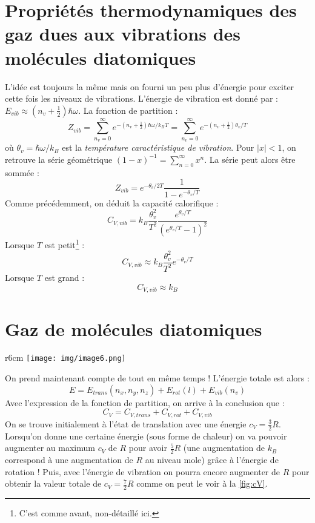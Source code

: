 \documentclass[british,french,11pt, a4paper, openany]{book}
\begin{document}
\section{Propriétés thermodynamiques des gaz dues aux vibrations des molécules 
	diatomiques}
L'idée est toujours la même mais on fourni un peu plus d'énergie pour exciter cette fois
les niveaux de vibrations. L'énergie de vibration est donné par : $E_{vib} \approx (n_v
+\frac{1}{2} )\hbar\omega$. La fonction de partition :
\begin{equation}
	Z_{vib} = \sum_{n_v=0}^\infty e^{-(n_v+\frac{1}{2})\hbar\omega/k_BT} = \sum_{n_v=0}^\infty
	e^{-(n_v+\frac{1}{2})\theta_v/T}
\end{equation}
où $\theta_v = \hbar\omega/k_B$ est la \textit{température caractéristique de vibration}.
Pour $|x|<1$, on retrouve la série géométrique $(1-x)^{-1} = \sum_{n=0}^\infty x^n$. La 
série peut alors être sommée : 
\begin{equation}
	Z_{vib} = e^{-\theta_v/2T}\frac{1}{1-e^{-\theta_v/T}}
\end{equation}
Comme précédemment, on déduit la capacité calorifique :
\begin{equation}
	C_{V,vib} = k_B \frac{\theta_v^2}{T^2}\frac{e^{\theta_v/T}}{(e^{\theta_v/T}-1)^2}
\end{equation}
Lorsque $T$ est petit\footnote{C'est comme avant, non-détaillé ici.} :
\begin{equation}
	C_{V,vib} \approx k_B \frac{\theta_v^2}{T^2}e^{-\theta_v/T}
\end{equation}
Lorsque $T$ est grand :
\begin{equation}
	C_{V,vib} \approx k_B
\end{equation}


\section{Gaz de molécules diatomiques}
\begin{wrapfigure}[14]{r}{6cm}
	\texttt{[image: img/image6.png]}
	\label{fig:cV}
\end{wrapfigure}
On prend maintenant compte de tout en même temps ! L'énergie totale est alors :
\begin{equation}
	E = E_{trans}(n_x,n_y,n_z) + E_{rot}(l) + E_{vib}(n_v)
\end{equation}
Avec l'expression de la fonction de partition, on arrive à la conclusion que :
\begin{equation}
	C_V = C_{V,trans} + C_{V,rot} + C_{V,vib}
\end{equation}
On se trouve initialement à l'état de translation avec une énergie $c_V = \frac{3}{2}R$.
Lorsqu'on donne une certaine énergie (sous forme de chaleur) on va pouvoir augmenter 
au maximum $c_V$ de $R$ pour avoir $\frac{5}{2}R$ (une augmentation de $k_B$ correspond à
une augmentation de $R$ au niveau mole) grâce à l'énergie de rotation ! Puis, avec l'énergie
de vibration on pourra encore augmenter de $R$ pour obtenir la valeur totale de $c_V = \frac{7}{2}
R$ comme on peut le voir à la \autoref{fig:cV}.
\end{document}
